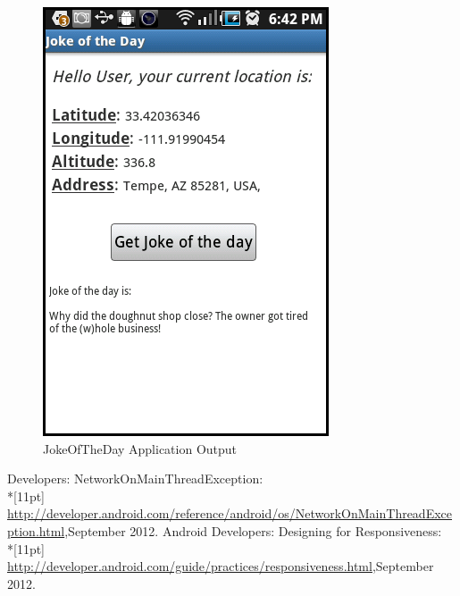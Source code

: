 \documentclass[11pt]{report}
\begin{document}
\begin{figure}
\label{fig:img3}
\caption{JokeOfTheDay Application Output}
\centerline{\includegraphics[scale=0.6]{3_Joke_Displayed_On_Screen}}
\end{figure}

\begin{thebibliography}{3}
\bibitem{} Developers: NetworkOnMainThreadException:
\\*[11pt] \url{http://developer.android.com/reference/android/os/NetworkOnMainThreadException.html},September 2012.
\bibitem{} Android Developers: Designing for Responsiveness:
\\*[11pt] \url{http://developer.android.com/guide/practices/responsiveness.html},September 2012.
\end{thebibliography}
\end{document}
